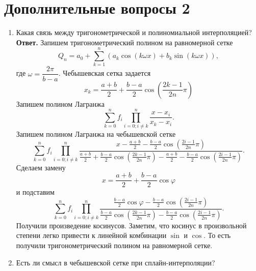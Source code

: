 \documentclass{article}
\begin{document}
    \section{Дополнительные вопросы 2}
    \begin{enumerate}
        \item Какая связь между тригонометрической и полиномиальной интерполяцией?
        \newline
        {\bfseries Ответ. } 
        Запишем тригонометрический полином на равномерной сетке 
        \begin{equation*}
            Q_n = a_0 + \sum_{k=1}^{n} (a_k \cos (k \omega x) + b_k \sin (k \omega x)),
        \end{equation*}
        где $\omega = \dfrac{2 \pi}{b-a}$.
        Чебышевская сетка задается 
        \begin{equation*}
            x_k = \frac{a+b}{2} + \frac{b-a}{2} \cos (\frac{2k-1}{2n} \pi)
        \end{equation*}
        Запишем полином Лагранжа 
        \begin{equation*}
            \sum_{k=0}^{n} f_i \prod_{i=0;i\neq k}^{n} \dfrac{x-x_i}{x_k - x_i}.
        \end{equation*}
        Запишем полином Лагранжа на чебышевской сетке 
        \begin{equation*}
            \sum_{k=0}^{n} f_i \prod_{i=0;i\neq k}^{n} \dfrac{x-\frac{a+b}{2} - \frac{b-a}{2} \cos (\frac{2i-1}{2n} \pi)}{\frac{a+b}{2} + \frac{b-a}{2} \cos (\frac{2k-1}{2n} \pi) -\frac{a+b}{2} - \frac{b-a}{2} \cos (\frac{2i-1}{2n} \pi)}.
        \end{equation*}
        Сделаем замену 
        \begin{equation*}
            x = \frac{a+b}{2} + \frac{b-a}{2} \cos \varphi
        \end{equation*}
        и подставим
        \begin{equation*}
            \sum_{k=0}^{n} f_i \prod_{i=0;i\neq k}^{n} \dfrac{ \frac{b-a}{2} \cos \varphi - \frac{b-a}{2} \cos (\frac{2i-1}{2n} \pi)}{\frac{b-a}{2} \cos (\frac{2k-1}{2n} \pi)  - \frac{b-a}{2} \cos (\frac{2i-1}{2n} \pi)}.
        \end{equation*}
        Получили произведение косинусов. Заметим, что косинус в произвольной степени легко привести к линейной комбинации $\sin$ и $\cos$. То есть получили тригонометрический полином на равномерной сетке.
        \item Есть ли смысл в чебышевской сетке при сплайн-интерполяции?

\end{enumerate}
\end{document}
